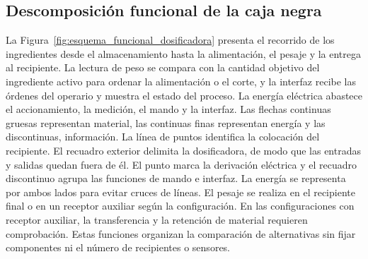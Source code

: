 \subsection{Descomposición funcional de la caja negra}

La Figura~\ref{fig:esquema_funcional_dosificadora} presenta el recorrido
de los ingredientes desde el almacenamiento hasta la alimentación, el
pesaje y la entrega al recipiente. La lectura de peso se compara con la
cantidad objetivo del ingrediente activo para ordenar la alimentación
o el corte, y la interfaz recibe las órdenes del operario y muestra el
estado del proceso. La energía eléctrica abastece el accionamiento,
la medición, el mando y la interfaz. Las flechas continuas gruesas
representan material, las continuas finas representan energía y las
discontinuas, información. La línea de puntos identifica la colocación
del recipiente. El recuadro exterior delimita la dosificadora, de modo
que las entradas y salidas quedan fuera de él. El punto marca la
derivación eléctrica y el recuadro discontinuo agrupa las funciones de mando
e interfaz. La energía se representa por ambos lados para evitar cruces de
líneas. El pesaje se realiza en el recipiente final o en un
receptor auxiliar según la configuración. En las configuraciones con
receptor auxiliar, la transferencia y la retención de material requieren
comprobación. Estas funciones organizan
la comparación de alternativas sin fijar componentes ni el número de
recipientes o sensores.

